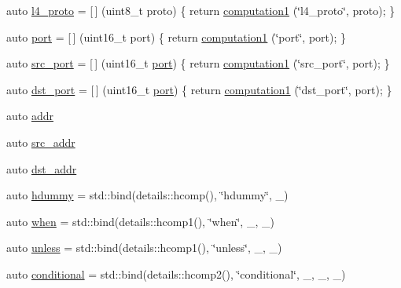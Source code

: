 \begin{DoxyCompactItemize}
\item 
auto \hyperlink{namespacepfq__lang_1_1anonymous__namespace_02default_8hpp_03_a75da77904f1cff4cc42fc3a081f80670}{l4\-\_\-proto} = \mbox{[}$\,$\mbox{]} (uint8\-\_\-t proto) \{ return \hyperlink{namespacepfq__lang_a58e7e358fc7c95121f74d56c094b1627}{computation1} (\char`\"{}l4\-\_\-proto\char`\"{}, proto); \}
\item 
auto \hyperlink{namespacepfq__lang_1_1anonymous__namespace_02default_8hpp_03_a1b370b44e5eedc364f3bb306d5042738}{port} = \mbox{[}$\,$\mbox{]} (uint16\-\_\-t port) \{ return \hyperlink{namespacepfq__lang_a58e7e358fc7c95121f74d56c094b1627}{computation1} (\char`\"{}port\char`\"{}, port); \}
\item 
auto \hyperlink{namespacepfq__lang_1_1anonymous__namespace_02default_8hpp_03_ad4d03d1e69ba9608a2d87ac91a2b521f}{src\-\_\-port} = \mbox{[}$\,$\mbox{]} (uint16\-\_\-t \hyperlink{namespacepfq__lang_1_1anonymous__namespace_02default_8hpp_03_a1b370b44e5eedc364f3bb306d5042738}{port}) \{ return \hyperlink{namespacepfq__lang_a58e7e358fc7c95121f74d56c094b1627}{computation1} (\char`\"{}src\-\_\-port\char`\"{}, port); \}
\item 
auto \hyperlink{namespacepfq__lang_1_1anonymous__namespace_02default_8hpp_03_aceccbe6ec912638fb8d5d3d9e0372a09}{dst\-\_\-port} = \mbox{[}$\,$\mbox{]} (uint16\-\_\-t \hyperlink{namespacepfq__lang_1_1anonymous__namespace_02default_8hpp_03_a1b370b44e5eedc364f3bb306d5042738}{port}) \{ return \hyperlink{namespacepfq__lang_a58e7e358fc7c95121f74d56c094b1627}{computation1} (\char`\"{}dst\-\_\-port\char`\"{}, port); \}
\item 
auto \hyperlink{namespacepfq__lang_1_1anonymous__namespace_02default_8hpp_03_aafce8334d1be83bff9a2115439c8c453}{addr}
\item 
auto \hyperlink{namespacepfq__lang_1_1anonymous__namespace_02default_8hpp_03_a63c87ff605d7cefa807fd61bc463785d}{src\-\_\-addr}
\item 
auto \hyperlink{namespacepfq__lang_1_1anonymous__namespace_02default_8hpp_03_a4b72bac7c3af312ffe7c670eb2583f9a}{dst\-\_\-addr}
\item 
auto \hyperlink{namespacepfq__lang_1_1anonymous__namespace_02default_8hpp_03_a4e7cf4874b42c5722f420fc54f360242}{hdummy} = std\-::bind(details\-::hcomp(), \char`\"{}hdummy\char`\"{}, \-\_)
\item 
auto \hyperlink{namespacepfq__lang_1_1anonymous__namespace_02default_8hpp_03_a10e1a2f363aa41a978622f322ac6241f}{when} = std\-::bind(details\-::hcomp1(), \char`\"{}when\char`\"{}, \-\_, \-\_)
\item 
auto \hyperlink{namespacepfq__lang_1_1anonymous__namespace_02default_8hpp_03_af01f3831a7b0294b6ffef87a09b481d7}{unless} = std\-::bind(details\-::hcomp1(), \char`\"{}unless\char`\"{}, \-\_, \-\_)
\item 
auto \hyperlink{namespacepfq__lang_1_1anonymous__namespace_02default_8hpp_03_a022d0075edf2fff575b93377aec0c228}{conditional} = std\-::bind(details\-::hcomp2(), \char`\"{}conditional\char`\"{}, \-\_, \-\_, \-\_)
\end{DoxyCompactItemize}


